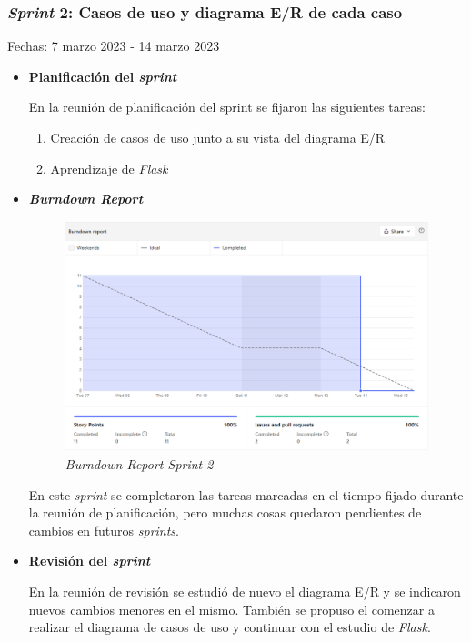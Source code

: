 \subsubsection{\textit{Sprint} 2: Casos de uso y diagrama E/R de cada caso}
Fechas: 7 marzo 2023 - 14 marzo 2023
\begin{itemize}
\item\textbf{Planificación del \textit{sprint}}

En la reunión de planificación del sprint se fijaron las siguientes tareas:
\begin{enumerate}
	\item Creación de casos de uso junto a su vista del diagrama E/R
	\item Aprendizaje de \textit{Flask}
\end{enumerate}

\item\textbf{\textit{Burndown Report}}

\begin{figure}[h]
	\centering
	\includegraphics[width=\textwidth]{../img/Anexos/Sprints/Sprint2.png}
	\caption{\textit{Burndown Report Sprint 2}}
\end{figure}
\FloatBarrier
En este \textit{sprint} se completaron las tareas marcadas en el tiempo fijado durante la reunión de planificación, pero muchas cosas quedaron pendientes de cambios en futuros \textit{sprints}.

\item\textbf{Revisión del \textit{sprint}}

En la reunión de revisión se estudió de nuevo el diagrama E/R y se indicaron nuevos cambios menores en el mismo. También se propuso el comenzar a realizar el diagrama de casos de uso y continuar con el estudio de \textit{Flask}.
\end{itemize}

